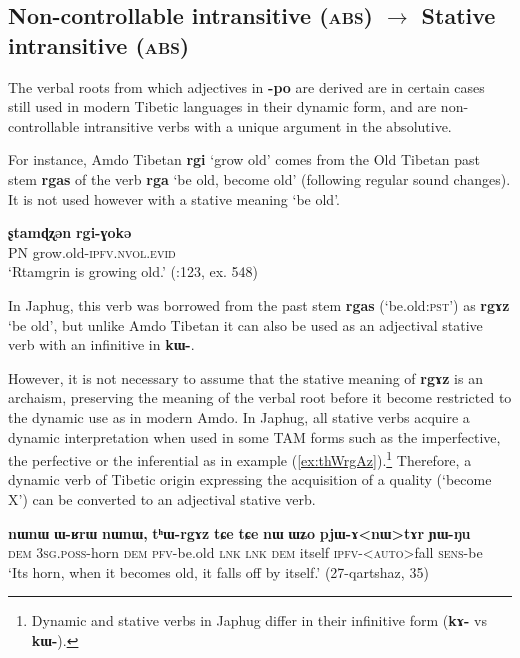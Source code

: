 \documentclass[oneside,a4paper,11pt]{article}
\newcommand{\ipa}[1]{{\phon\textbf{\mbox{#1}}}} %
\newcommand{\refb}[1]{(\ref{#1})}
\begin{document}
  
\subsection{Non-controllable intransitive (\textsc{abs}) $\rightarrow$ Stative intransitive (\textsc{abs})}
The verbal roots from which adjectives in \ipa{-po} are derived are in certain cases still used in modern Tibetic languages in their dynamic form, and are non-controllable intransitive verbs with a unique argument in the absolutive.

For instance, Amdo Tibetan \ipa{rgi} `grow old' comes from the Old Tibetan past stem \ipa{rgas} of the verb \ipa{rga} `be old, become old' (following regular sound changes). It is not used however with a stative meaning `be old'.

\begin{exe}
\ex \label{ex:rgi}
\gll
\ipa{ʂtamɖʐən} 	\ipa{rgi-ɣokə}  	 \\
PN grow.old-\textsc{ipfv.nvol.evid} \\
\glt `Rtamgrin is growing old.' (\citealt{haller04themchen}:123, ex. 548)
\end{exe}

In Japhug, this verb was borrowed from the past stem \ipa{rgas} (`be.old:\textsc{pst}') as \ipa{rgɤz} `be old', but unlike Amdo Tibetan it can also be used as an adjectival stative verb with an infinitive in \ipa{kɯ-}. 

However, it is not necessary to assume that the stative meaning of \ipa{rgɤz} is an archaism, preserving the meaning of the verbal root before it become restricted to the dynamic use as in modern Amdo. In Japhug, all stative verbs acquire a dynamic interpretation when used in some TAM forms such as the imperfective, the perfective or the inferential as in example \refb{ex:thWrgAz}.\footnote{Dynamic and stative verbs in Japhug differ in their infinitive form (\ipa{kɤ-} vs \ipa{kɯ-}). } Therefore, a dynamic verb of Tibetic origin expressing the acquisition of a quality (`become X') can be converted to an adjectival stative verb.

\begin{exe}
\ex \label{ex:thWrgAz}
\gll
\ipa{nɯnɯ}  	\ipa{ɯ-ʁrɯ}  	\ipa{nɯnɯ,}  	\ipa{tʰɯ-rgɤz}  	\ipa{tɕe}  	\ipa{tɕe}  	\ipa{nɯ}  	\ipa{ɯʑo}  	\ipa{pjɯ-ɤ<nɯ>tɤr}  	\ipa{ɲɯ-ŋu}  \\
\textsc{dem} \textsc{3sg.poss}-horn \textsc{dem} \textsc{pfv}-be.old \textsc{lnk}  \textsc{lnk} \textsc{dem} itself \textsc{ipfv}-<\textsc{auto}>fall \textsc{sens}-be \\
\glt `Its horn, when it becomes old, it falls off by itself.' (27-qartshaz, 35)
\end{exe}
\end{document}
